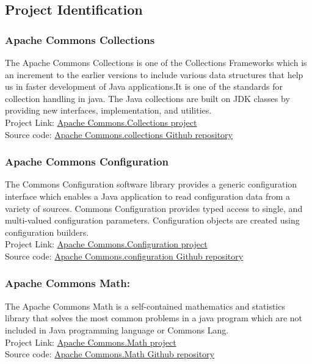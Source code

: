 \documentclass[letterpaper, 12 pt, conference]{ieeetran}  %
\begin{document}
\subsection{Project Identification}

\subsubsection{Apache Commons Collections}
The Apache Commons Collections is one of the Collections Frameworks which is an increment to the earlier versions to include various data structures that help us in faster development of Java applications.It is one of the standards for collection handling in java. The Java collections are built on JDK classes by providing new interfaces, implementation, and utilities.\cite{projectcollection}\\
Project Link: \href{http://commons.apache.org/proper/commons-collections/}{Apache Commons.Collections project}\cite{projectcollection}  \\
Source code: \href{http://github.com/apache/commons-collections/}{Apache Commons.collections Github repository}\cite{projectcollectiongit}
\\
\subsubsection{Apache Commons Configuration}
The Commons Configuration software library provides a generic configuration interface which enables a Java application to read configuration data from a variety of sources. Commons Configuration provides typed access to single, and multi-valued configuration parameters. Configuration objects are created using configuration builders.\cite{projectconfiguration}\\
Project Link: \href{http://commons.apache.org/proper/commons-configuration/}{Apache Commons.Configuration project}\cite{projectconfiguration}  \\
Source code: \href{http://github.com/apache/commons-configuration/}{Apache Commons.configuration Github repository}\cite{projectconfigurationgit}
\\
\subsubsection{Apache Commons Math:}
The Apache Commons Math is a self-contained mathematics and statistics library that solves the most common problems in a java program which are not included in Java programming language or Commons Lang.\cite{projectmath}\\
Project Link: \href{http://commons.apache.org/proper/commons-math/}{Apache Commons.Math project}\cite{projectmath}  \\
Source code: \href{http://github.com/apache/commons-math/}{Apache Commons.Math Github repository}\cite{projectmathgit}
\\
\end{document}
